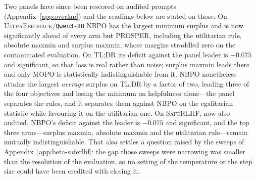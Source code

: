 \documentclass{article}
\theoremstyle{remark}
\theoremstyle{plain}
\newcommand{\NBPO}{\textsc{NBPO}}
\begin{document}
Two panels have since been rescored on audited prompts (Appendix~\ref{app:overlap}) and the readings
below are stated on those. On \textsc{UltraFeedback}/\texttt{Qwen3-8B} \NBPO{} has the largest minimum
surplus and is now significantly ahead of every arm but PROSPER, including the utilitarian rule, absolute
maxmin and surplus maxmin, whose margins straddled zero on the contaminated evaluation. On \textsc{TL;DR}
its deficit against the panel leader is $-0.075$ and significant, so that loss is real rather than noise;
surplus maxmin leads there and only MOPO is statistically indistinguishable from it. \NBPO{} nonetheless
attains the largest \emph{average} surplus on \textsc{TL;DR} by a factor of two, leading three of the four
objectives and losing the minimum on helpfulness alone---the panel separates the rules, and it separates
them against \NBPO{} on the egalitarian statistic while favouring it on the utilitarian one.
On \textsc{SafeRLHF}, now also audited, \NBPO{}'s deficit against the leader is $-0.075$ and significant,
and the top three arms---surplus maxmin, absolute maxmin and the utilitarian rule---remain mutually
indistinguishable. That also settles a question raised by the sweeps of
Appendix~\ref{app:beta-saferlhf}: the gap those sweeps were narrowing was smaller than the resolution of
the evaluation, so no setting of the temperature or the step size could have been credited with closing
it.
\end{document}
